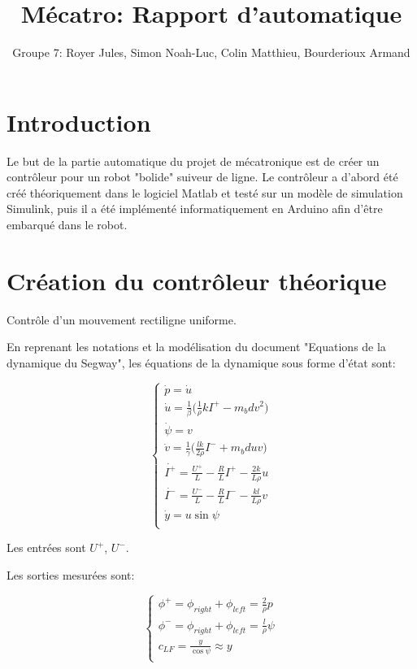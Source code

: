 \documentclass{report}
\title{Mécatro: Rapport d'automatique}
\author{Groupe 7: Royer Jules, Simon Noah-Luc, Colin Matthieu, Bourderioux Armand}
\date{}
\begin{document}
\maketitle

\tableofcontents

\chapter{Introduction}
Le but de la partie automatique du projet de mécatronique est de créer un contrôleur
pour un robot "bolide" suiveur de ligne. Le contrôleur a d'abord été créé théoriquement
dans le logiciel Matlab et testé sur un modèle de simulation Simulink, puis il a été
implémenté informatiquement en Arduino afin d'être embarqué dans le robot.

\chapter{Création du contrôleur théorique}

Contrôle d'un mouvement rectiligne uniforme.

En reprenant les notations et la modélisation du document "Equations de la dynamique du Segway",
les équations de la dynamique sous forme d'état sont:

\begin{equation*}
    \begin{cases}
        \dot{p} = \dot{u} \\
        \dot{u} = \frac{1}{\beta}\big( \frac{1}{\rho}kI^{+} - m_bdv^2 \big) \\
        \dot{\psi} = v \\
        \dot{v} = \frac{1}{\gamma}\big( \frac{lk}{2\rho}I^{-} + m_bduv \big) \\
        \dot{I^{+}} = \frac{U^{+}}{L} - \frac{R}{L}I^{+} - \frac{2k}{L\rho}u \\
        \dot{I^{-}} = \frac{U^{-}}{L} - \frac{R}{L}I^{-} - \frac{kl}{L\rho}v \\
        \dot{y} = u\sin\psi \\
    \end{cases}
\end{equation*}

Les entrées sont $U^{+}$, $U^{-}$.

Les sorties mesurées sont:

\begin{equation*}
    \begin{cases}
        \phi^{+} = \phi_{right} + \phi_{left} = \frac{2}{\rho}p \\
        \phi^{-} = \phi_{right} + \phi_{left} = \frac{l}{\rho}\psi \\
        c_{LF} = \frac{y}{\cos\psi} \approx y \\
    \end{cases}
\end{equation*}
\end{document}
